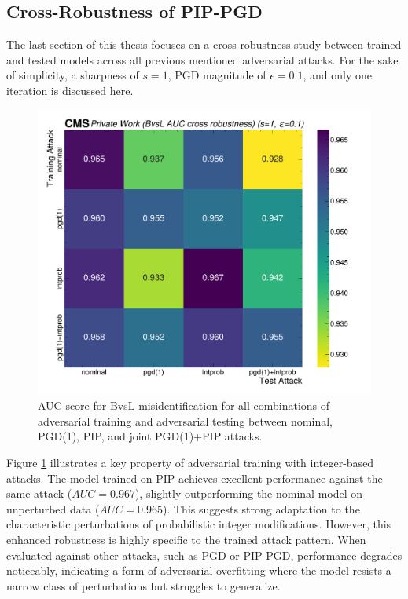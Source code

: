 \subsection{Cross-Robustness of PIP-PGD}

The last section of this thesis focuses on a cross-robustness study between trained and tested models across all previous mentioned adversarial attacks. For the sake of simplicity, a sharpness of $s=1$, PGD magnitude of $\epsilon=0.1$, and only one iteration is discussed here.

\begin{figure}[h]
\centering
    \includegraphics[width=12cm]{media/cross_robustness.pdf}
    \caption{AUC score for BvsL misidentification for all combinations of adversarial training and adversarial testing between nominal, PGD(1), PIP, and joint PGD(1)+PIP attacks.}
    \label{fig:cross_robustness}
\end{figure}

Figure \ref{fig:cross_robustness} illustrates a key property of adversarial training with integer-based attacks. The model trained on PIP achieves excellent performance against the same attack ($AUC = 0.967$), slightly outperforming the nominal model on unperturbed data ($AUC = 0.965$). This suggests strong adaptation to the characteristic perturbations of probabilistic integer modifications. However, this enhanced robustness is highly specific to the trained attack pattern. When evaluated against other attacks, such as PGD or PIP-PGD, performance degrades noticeably, indicating a form of adversarial overfitting where the model resists a narrow class of perturbations but struggles to generalize.

